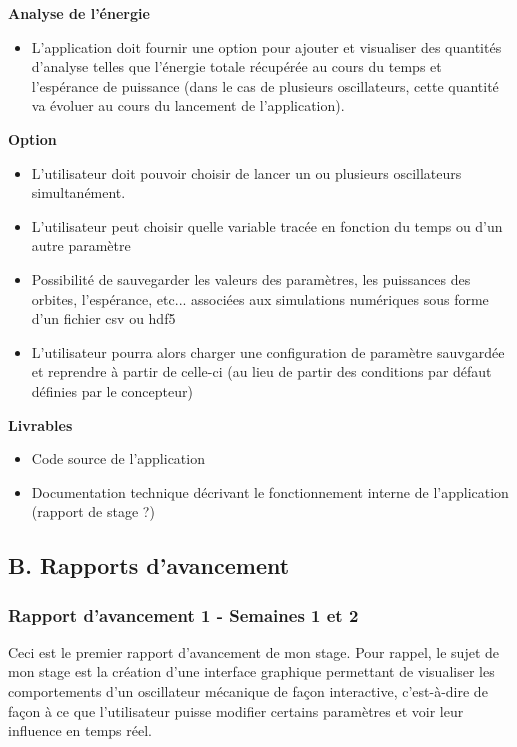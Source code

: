\documentclass[a4paper, french, 12pt, titlepage]{article}
\begin{document}
\textbf{Analyse de l'énergie}
\begin{itemize}
  \item L'application doit fournir une option pour ajouter et visualiser des quantités d'analyse telles que l'énergie totale récupérée au cours du temps et l'espérance de puissance (dans le cas de plusieurs oscillateurs, cette quantité va évoluer au cours du lancement de l'application).
\end{itemize}

\textbf{Option}
\begin{itemize}

  \item L'utilisateur doit pouvoir choisir de lancer un ou plusieurs oscillateurs simultanément.
  \item L'utilisateur peut choisir quelle variable tracée en fonction du temps ou d'un autre paramètre
  \item Possibilité de sauvegarder les valeurs des paramètres, les puissances des orbites, l'espérance, etc... associées aux simulations numériques sous forme d'un fichier csv ou hdf5
  \item L'utilisateur pourra alors charger une configuration de paramètre sauvgardée et reprendre à partir de celle-ci (au lieu de partir des conditions par défaut définies par le concepteur)

\end{itemize}

\textbf{Livrables}
\begin{itemize}

  \item Code source de l'application
  \item Documentation technique décrivant le fonctionnement interne de l'application (rapport de stage ?)
\end{itemize}


\newpage



\subsection*{B. Rapports d'avancement}

\subsubsection*{Rapport d'avancement 1 - Semaines 1 et 2}

Ceci est le premier rapport d'avancement de mon stage. Pour rappel, le sujet de mon stage est la création d'une interface graphique permettant de visualiser les comportements d'un oscillateur mécanique de façon interactive, c'est-à-dire de façon à ce que l'utilisateur puisse modifier certains paramètres et voir leur influence en temps réel. \\
\end{document}
